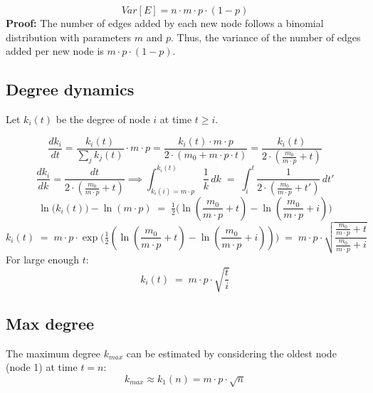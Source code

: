 \documentclass{article}
\begin{document}
\begin{equation}
    Var[E] = n \cdot m \cdot p \cdot (1 - p)
\end{equation}
\textbf{Proof:} The number of edges added by each new node follows a binomial distribution with parameters $m$ and $p$. Thus, the variance of the number of edges added per new node is $m \cdot p \cdot (1 - p)$.

\subsection*{Degree dynamics}
Let $k_i(t)$ be the degree of node $i$ at time $t \geq i$.

\begin{equation}
    \frac{dk_i}{dt} = \frac{k_i(t)}{\sum_{j} k_j(t)} \cdot m \cdot p = \frac{k_i(t) \cdot m \cdot p}{2 \cdot (m_0 + m \cdot p \cdot t)} = \frac{k_i(t)}{2 \cdot (\frac{m_0}{m \cdot p} + t)}
\end{equation}
\begin{equation}
    \frac{dk_i}{dk} = \frac{dt}{2 \cdot (\frac{m_0}{m \cdot p} + t)} \implies 
    \int_{k_i(i) = m \cdot p}^{k_i(t)} \frac{1}{k}\, dk \;=\; \int_{i}^{t} \frac{1}{2 \cdot (\frac{m_0}{m \cdot p} + t')}\, dt'
\end{equation}
\begin{equation}
    \ln\!\big(k_i(t)\big) - \ln(m \cdot p) \;=\; \tfrac{1}{2}\big(\ln(\frac{m_0}{m \cdot p} + t) - \ln(\frac{m_0}{m \cdot p} + i)\big)
\end{equation}
\begin{equation}
    k_i(t) \;=\; m \cdot p \cdot \exp\!\big(\tfrac{1}{2}(\ln(\frac{m_0}{m \cdot p} + t) - \ln(\frac{m_0}{m \cdot p} + i))\big) \;=\; m \cdot p \cdot \sqrt{\frac{\frac{m_0}{m \cdot p} + t}{\frac{m_0}{m \cdot p} + i}}
\end{equation}
For large enough $t$:
\begin{equation}
    k_i(t) \;=\; m \cdot p \cdot \sqrt{\frac{t}{i}}
\end{equation}


\subsection*{Max degree}
The maximum degree $k_{max}$ can be estimated by considering the oldest node (node 1) at time $t = n$:
\begin{equation}
    k_{max} \approx k_1(n) = m \cdot p \cdot \sqrt{n}
\end{equation}
\end{document}
